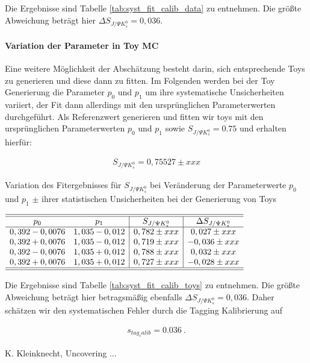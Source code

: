 \documentclass[a4paper]{scrbook}
\newcommand{\SJPsi}{S_{J/\Psi K_s^0}}
\begin{document}
Die Ergebnisse sind Tabelle \ref{tab:syst_fit_calib_data} zu entnehmen. Die größte Abweichung beträgt hier $\Delta\SJPsi = 0,036$.

\paragraph{Variation der Parameter in \gls{Toy MC}}
Eine weitere Möglichkeit der Abschätzung besteht darin, sich entsprechende Toys zu generieren und diese dann zu fitten. Im Folgenden werden bei der Toy Generierung die Parameter $p_0$ und $p_1$ um ihre systematische Unsicherheiten variiert, der Fit dann allerdings mit den ursprünglichen Parameterwerten durchgeführt. Als Referenzwert generieren und fitten wir toys mit den ursprünglichen Parameterwerten $p_0$ und $p_1$ sowie $\SJPsi = 0.75$ und erhalten hierfür:

\begin{align}
\SJPsi = 0,75527 \pm xxx
\end{align}

\begin{table}[hptb]
\centering
\caption{Variation des Fitergebnisses für $\SJPsi$ bei Veränderung der Parameterwerte $p_0$ und $p_1$ $\pm$ ihrer statistischen Unsicherheiten bei der Generierung von Toys}
\label{tab:syst_fit_calib_toys}
$\begin{array}{cc|c|c}
\hline\hline
p_0            & p_1           & \SJPsi          & \Delta\SJPsi   \\ \hline
0,392 - 0,0076 & 1,035 - 0,012 & 0,782 \pm xxx & 0,027 \pm xxx \\
0,392 + 0,0076 & 1,035 - 0,012 & 0,719 \pm xxx & -0,036 \pm xxx \\
0,392 - 0,0076 & 1,035 + 0,012 & 0,788 \pm xxx & 0,032 \pm xxx \\
0,392 + 0,0076 & 1,035 + 0,012 & 0,727 \pm xxx & -0,028 \pm xxx \\
\hline\hline
\end{array}$
\end{table}

Die Ergebnisse sind Tabelle \ref{tab:syst_fit_calib_toys} zu entnehmen. Die größte Abweichung beträgt hier betragsmäßig ebenfalls $\Delta\SJPsi = 0,036$. Daher schätzen wir den systematischen Fehler durch die Tagging Kalibrierung auf 

\begin{align}
s_{tag_calib} = 0.036 \ .
\end{align}

\begin{thebibliography}{---}
  K. Kleinknecht, Uncovering ...
\end{thebibliography}

\printglossaries 

\end{document}

